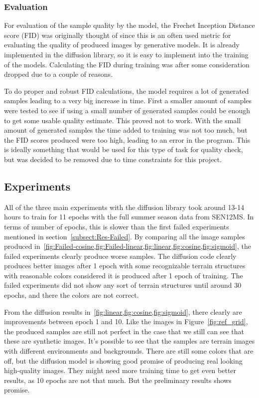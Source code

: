 \documentclass[fullpaper]{nldl}
\begin{document}
\subsubsection{Evaluation}
\label{subsubsect:Eval}
For evaluation of the sample quality by the model, the Frechet Inception Distance score (FID) was originally thought of since this is an often used metric for evaluating the quality of produced images by generative models. It is already implemented in the diffusion library, so it is easy to implement into the training of the models. Calculating the FID during training was after some consideration dropped due to a couple of reasons. 

To do proper and robust FID calculations, the model requires a lot of generated samples leading to a very big increase in time. First a smaller amount of samples were tested to see if using a small number of generated samples could be enough to get some usable quality estimate. This proved not to work. With the small amount of generated samples the time added to training was not too much, but the FID scores produced were too high, leading to an error in the program. This is ideally something that would be used for this type of task for quality check, but was decided to be removed due to time constraints for this project.


\subsection{Experiments}
All of the three main experiments with the diffusion library took around 13-14 hours to train for 11 epochs with the full summer season data from SEN12MS. In terms of number of epochs, this is slower than the first failed experiments mentioned in section~\ref{subsect:Res-Failed}. By comparing all the image samples produced in~\cref{fig:Failed-cosine,fig:Failed-linear,fig:linear,fig:cosine,fig:sigmoid}, the failed experiments clearly produce worse samples. The diffusion code clearly produces better images after 1 epoch with some recognizable terrain structures with reasonable colors considered it is produced after 1 epoch of training. The failed experiments did not show any sort of terrain structures until around 30 epochs, and there the colors are not correct. 

From the diffusion results in~\cref{fig:linear,fig:cosine,fig:sigmoid}, there clearly are improvements between epoch 1 and 10. Like the images in Figure~\ref{fig:ref_grid}, the produced samples are still not perfect in the case that we still can see that these are synthetic images. It's possible to see that the samples are terrain images with different environments and backgrounds. There are still some colors that are off, but the diffusion model is showing good promise of producing real looking high-quality images. They might need more training time to get even better results, as 10 epochs are not that much. But the preliminary results shows promise.
\end{document}
